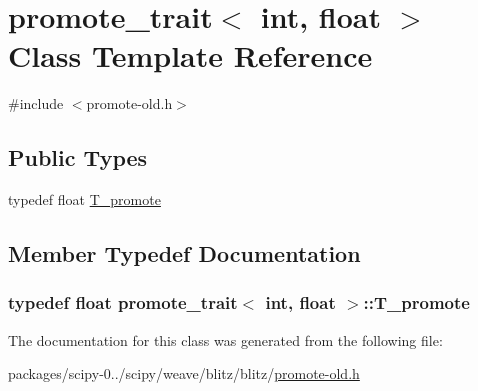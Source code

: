 \hypertarget{classpromote__trait_3_01int_00_01float_01_4}{}\section{promote\+\_\+trait$<$ int, float $>$ Class Template Reference}
\label{classpromote__trait_3_01int_00_01float_01_4}


{\ttfamily \#include $<$promote-\/old.\+h$>$}

\subsection*{Public Types}
\begin{DoxyCompactItemize}
\item 
typedef float \hyperlink{classpromote__trait_3_01int_00_01float_01_4_aea36fea46ecc3faf02f2bcf922c6a33d}{T\+\_\+promote}
\end{DoxyCompactItemize}


\subsection{Member Typedef Documentation}
\hypertarget{classpromote__trait_3_01int_00_01float_01_4_aea36fea46ecc3faf02f2bcf922c6a33d}{}
\subsubsection[{T\+\_\+promote}]{\setlength{\rightskip}{0pt plus 5cm}typedef float {\bf promote\+\_\+trait}$<$ int, float $>$\+::{\bf T\+\_\+promote}}\label{classpromote__trait_3_01int_00_01float_01_4_aea36fea46ecc3faf02f2bcf922c6a33d}


The documentation for this class was generated from the following file\+:\begin{DoxyCompactItemize}
\item 
packages/scipy-\/0../scipy/weave/blitz/blitz/\hyperlink{promote-old_8h}{promote-\/old.\+h}\end{DoxyCompactItemize}
